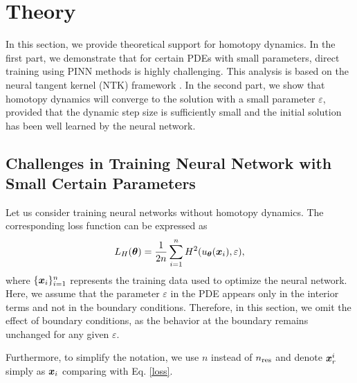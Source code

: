 \section{Theory}
\label{sec:theory}
In this section, we provide theoretical support for homotopy dynamics. In the first part, we demonstrate that for certain PDEs with small parameters, direct training using PINN methods is highly challenging. This analysis is based on the neural tangent kernel (NTK) framework \cite{allen2019convergence}. In the second part, we show that homotopy dynamics will converge to the solution with a small parameter \( \varepsilon \), provided that the dynamic step size is sufficiently small and the initial solution has been well learned by the neural network.
\subsection{Challenges in Training Neural Network with Small Certain Parameters}
Let us consider training neural networks without homotopy dynamics. The corresponding loss function can be expressed as  
\begin{align}
    L_H(\boldsymbol{\theta}) = \frac{1}{2n} \sum_{i=1}^n H^2(u_{\boldsymbol{\theta}}(\boldsymbol{x}_i),\varepsilon),
\label{eq:hom_or_loss}
\end{align}  
where $\{\boldsymbol{x}_i\}_{i=1}^n$ represents the training data used to optimize the neural network. Here, we assume that the parameter $\varepsilon$ in the PDE appears only in the interior terms and not in the boundary conditions. Therefore, in this section, we omit the effect of boundary conditions, as the behavior at the boundary remains unchanged for any given $\varepsilon$.  

Furthermore, to simplify the notation, we use $n$ instead of $n_\textup{res}$ and denote $\boldsymbol{x}_r^i$ simply as $\boldsymbol{x}_i$ comparing with Eq. \eqref{loss}.


